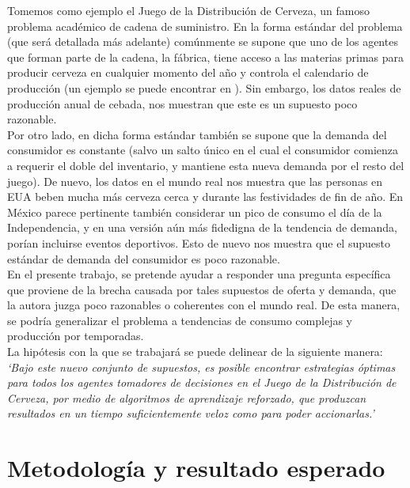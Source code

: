 Tomemos como ejemplo el Juego de la Distribuci\'on de Cerveza, un famoso problema acad\'emico de cadena de suministro. En la forma est\'andar del problema (que ser\'a detallada m\'as adelante) com\'unmente se supone que uno de los agentes que forman parte de la cadena, la f\'abrica, tiene acceso a las materias primas para producir cerveza en cualquier momento del a\~no y controla el calendario de producci\'on (un ejemplo se puede encontrar en \citet{Sterman}). Sin embargo, los datos reales de producci\'on anual de cebada, nos muestran que este es un supuesto poco razonable.\\

Por otro lado, en dicha forma est\'andar tambi\'en se supone que la demanda del consumidor es constante (salvo un salto \'unico en el cual el consumidor comienza a requerir el doble del inventario, y mantiene esta nueva demanda por el resto del juego). De nuevo, los datos en el mundo real nos muestra que las personas en EUA beben mucha m\'as cerveza cerca y durante las festividades de fin de a\~no. En M\'exico parece pertinente tambi\'en considerar un pico de consumo el d\'ia de la Independencia, y en una versi\'on a\'un m\'as fidedigna de la tendencia de demanda, por\'ian incluirse eventos deportivos. Esto de nuevo nos muestra que el supuesto est\'andar de demanda del consumidor es poco razonable.\\

En el presente trabajo, se pretende ayudar a responder una pregunta espec\'ifica que proviene de la brecha causada por tales supuestos de oferta y demanda, que la autora juzga poco razonables o coherentes con el mundo real. De esta manera, se podr\'ia generalizar el problema a tendencias de consumo complejas y producci\'on por temporadas.\\

La hip\'otesis con la que se trabajar\'a se puede delinear de la siguiente manera:\\

\textit{`Bajo este nuevo conjunto de supuestos, es posible encontrar estrategias \'optimas para todos los agentes tomadores de decisiones en el Juego de la Distribuci\'on de Cerveza, por medio de algoritmos de aprendizaje reforzado, que produzcan resultados en un tiempo suficientemente veloz como para poder accionarlas.'}\\

\section{Metodolog\'ia y resultado esperado}

